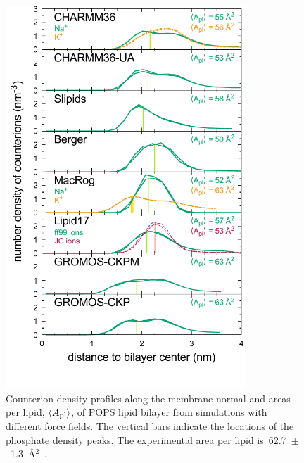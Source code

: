 \documentclass[journal=jpcbfk,manuscript=article]{achemso}
\begin{document}
\begin{figure}[!htb]
  \centering
  \includegraphics[width=9.0cm]{../Figs/NAdensPOPSformatted.pdf}
  \caption{\label{NAdensPOPS}
    Counterion density profiles along the membrane normal and areas per lipid, $\langle A_{\rm pl} \rangle$,
    of POPS lipid bilayer from simulations with different force fields.
    The vertical bars indicate the locations of the phosphate density peaks.
    The experimental area per lipid is~62.7~$\pm$~1.3~\AA$^2$~\cite{pan14}.
  }
\end{figure}
\end{document}
